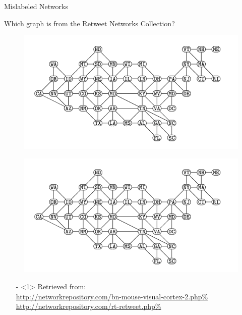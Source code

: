 \documentclass{beamer}
\begin{document}
\begin{frame}{Mislabeled Networks}
\begin{center}
Which graph is from the Retweet Networks Collection?
\end{center}

    \begin{figure}
        \centering
        \begin{minipage}[t]{0.48\textwidth}
            \includegraphics[scale = 0.26]{contiguous-usa-graph}
            \label{fig:tree}
        \end{minipage}\hfill
        \begin{minipage}[t]{0.48\textwidth}
            \includegraphics[scale = 0.26]{contiguous-usa-graph}
            \label{fig:rand_forest}
        \end{minipage}\hfill
    \end{figure}
    
\begin{itemize}
    \item[-]<1> \tiny Retrieved from:\\ 
    \url{http://networkrepository.com/bn-mouse-visual-cortex-2.php\%} \\ \vspace{-\baselineskip}
    \url{http://networkrepository.com/rt-retweet.php\%}
\end{itemize}


\end{frame}
\end{document}
